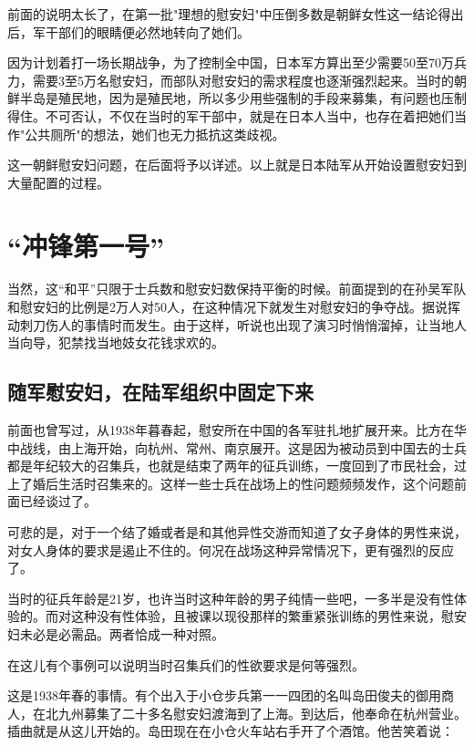 \documentclass[12pt,UTF8]{ctexbook}
\begin{document}
前面的说明太长了，在第一批"理想的慰安妇"中压倒多数是朝鲜女性这一结论得出后，军干部们的眼睛便必然地转向了她们。



因为计划着打一场长期战争，为了控制全中国，日本军方算出至少需要50至70万兵力，需要3至5万名慰安妇，而部队对慰安妇的需求程度也逐渐强烈起来。当时的朝鲜半岛是殖民地，因为是殖民地，所以多少用些强制的手段来募集，有问题也压制得住。不可否认，不仅在当时的军干部中，就是在日本人当中，也存在着把她们当作"公共厕所"的想法，她们也无力抵抗这类歧视。



这一朝鲜慰安妇问题，在后面将予以详述。以上就是日本陆军从开始设置慰安妇到大量配置的过程。


\chapter{“冲锋第一号”}

当然，这“和平”只限于士兵数和慰安妇数保持平衡的时候。前面提到的在孙吴军队和慰安妇的比例是2万人对50人，在这种情况下就发生对慰安妇的争夺战。据说挥动刺刀伤人的事情时而发生。由于这样，听说也出现了演习时悄悄溜掉，让当地人当向导，犯禁找当地妓女花钱求欢的。

\section{随军慰安妇，在陆军组织中固定下来}

前面也曾写过，从1938年暮春起，慰安所在中国的各军驻扎地扩展开来。比方在华中战线，由上海开始，向杭州、常州、南京展开。这是因为被动员到中国去的士兵都是年纪较大的召集兵，也就是结束了两年的征兵训练，一度回到了市民社会，过上了婚后生活时召集来的。这样一些士兵在战场上的性问题频频发作，这个问题前面已经谈过了。



可悲的是，对于一个结了婚或者是和其他异性交游而知道了女子身体的男性来说，对女人身体的要求是遏止不住的。何况在战场这种异常情况下，更有强烈的反应了。



当时的征兵年龄是21岁，也许当时这种年龄的男子纯情一些吧，一多半是没有性体验的。而对这种没有性体验，且被课以现役那样的繁重紧张训练的男性来说，慰安妇未必是必需品。两者恰成一种对照。



在这儿有个事例可以说明当时召集兵们的性欲要求是何等强烈。



这是1938年春的事情。有个出入于小仓步兵第一一四团的名叫岛田俊夫的御用商人，在北九州募集了二十多名慰安妇渡海到了上海。到达后，他奉命在杭州营业。插曲就是从这儿开始的。岛田现在在小仓火车站右手开了个酒馆。他苦笑着说：
\end{document}
